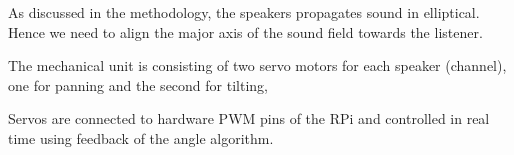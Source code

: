 \documentclass[../block_diagram_intro/block_diagram_intro.tex]{subfiles}
\begin{document}
    
As discussed in the methodology, the speakers propagates sound in elliptical. Hence we need 
to align the major axis of the sound field towards the listener.

The mechanical unit is consisting of two servo motors
for each speaker (channel), one for panning and the second
for tilting,

Servos are connected to hardware PWM pins of the RPi and controlled in real time using feedback 
of the angle algorithm.
\end{document}
